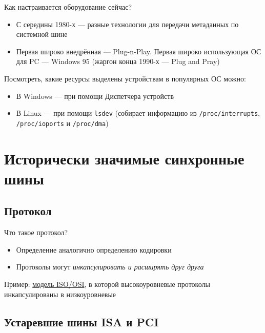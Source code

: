 \documentclass[xetex,aspectratio=43]{beamer}
\begin{document}
\begin{frame}[fragile]{Как настраивается оборудование сейчас?}
	\begin{itemize}
		\item
		С середины 1980-х --- разные технологии для передачи метаданных по
		системной шине
		\item
		Первая широко внедрённая --- Plug-n-Play. Первая широко использующая            ОС для PC --- Windows 95 (жаргон конца 1990-х --- Plug and Pray)
	\end{itemize}

	\pause

	Посмотреть, какие ресурсы выделены устройствам в популярных ОС можно:

	\begin{itemize}
		\item
		В Windows --- при помощи Диспетчера устройств
		\item
		В Linux --- при помощи \texttt{lsdev} (собирает информацию из
		\texttt{/proc/interrupts}, \texttt{/proc/ioports} и
		\texttt{/proc/dma})
	\end{itemize}
\end{frame}

\section{Исторически значимые синхронные шины}

\subsection{Протокол}

\begin{frame}{Что такое протокол?}
    \pause
    \begin{itemize}
        \item Определение аналогично определению кодировки
        \item Протоколы могут \em{инкапсулировать} и \em{расширять} друг друга
    \end{itemize}
    \pause
    Пример: \href{https://en.wikipedia.org/wiki/OSI_model\#Layer_architecture}{модель ISO/OSI}, в которой высокоуровневые протоколы инкапсулированы в низкоуровневые
\end{frame}

\subsection{Устаревшие шины ISA и PCI}
\end{document}
